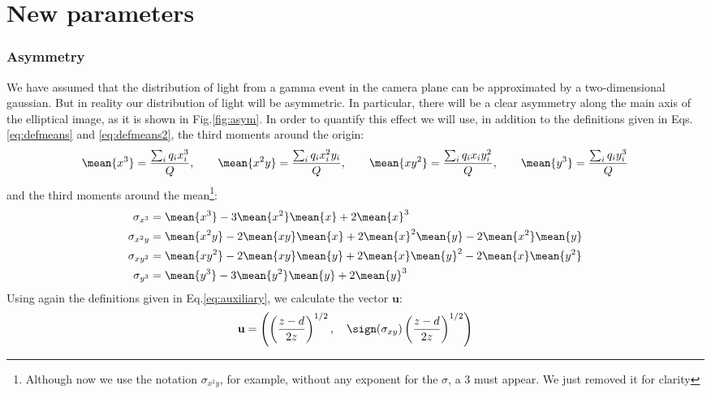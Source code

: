 \section{New parameters}

\subsubsection{Asymmetry}
%
We have assumed that the distribution of light from a gamma event in
the camera plane can be approximated by a two-dimensional gaussian.
But in reality our distribution of light will be asymmetric. In
particular, there will be a clear asymmetry along the main axis of the
elliptical image, as it is shown in Fig.\ref{fig:asym}. In order to
quantify this effect we will use, in addition to the definitions given
in Eqs.\eqref{eq:defmeans} and \eqref{eq:defmeans2}, the third moments
around the origin:
%
\begin{equation}
  \label{eq:defthirdmom}
  \mean{x^3} = \frac{\sum_i q_i x_i^3}{Q}, \qquad
  \mean{x^2y} = \frac{\sum_i q_i x_i^2 y_i}{Q}, \qquad
  \mean{xy^2} = \frac{\sum_i q_i x_i y_i^2}{Q}, \qquad
  \mean{y^3} = \frac{\sum_i q_i y_i^3}{Q}  
\end{equation}
%
and the third moments around the mean\footnote{Although now we use the
  notation $\sigma_{x^2y}$, for example, without any exponent for the
  $\sigma$, a $3$ must appear. We just removed it for clarity}:
%
\begin{equation}
  \label{eq:defthirmommean}
  \begin{split}
    \sigma_{x^3} & = \mean{x^3} - 3\mean{x^2}\mean{x} + 2\mean{x}^3\\
    \sigma_{x^2 y} & = \mean{x^2 y} - 2\mean{xy}\mean{x} 
    + 2\mean{x}^2\mean{y} - 2\mean{x^2}\mean{y} \\
    \sigma_{x y^2} & = \mean{x y^2} - 2\mean{xy}\mean{y} 
    + 2\mean{x}\mean{y}^2 - 2\mean{x}\mean{y^2} \\
    \sigma_{y^3} & = \mean{y^3} - 3\mean{y^2}\mean{y} + 2\mean{y}^3
  \end{split}
\end{equation}
%
Using again the definitions given in Eq.\eqref{eq:auxiliary}, we calculate the vector $\mathbf{u}$:
%
\begin{equation}
  \label{eq:vectoru}
  \mathbf{u} = \left(
    \left(\frac{z-d}{2z}\right)^{1/2},\quad
    \sign(\sigma_{xy})\left(\frac{z-d}{2z}\right)^{1/2}
    \right)
\end{equation}
